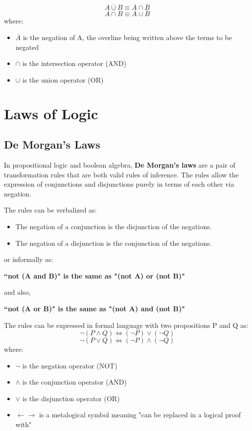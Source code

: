 \documentclass[12pt]{report}
\begin{document}
\[\overline{A \cup B}\equiv\overline{A} \cap \overline{B}\]
\[\overline{A \cap B}\equiv\overline{A} \cup \overline{B}\]
where:
\begin{itemize}
\item $\overline{A}$ is the negation of A, the overline being written above the terms to be negated
\item $\cap$ is the intersection operator (AND)
\item $\cup$ is the union operator (OR)
\end{itemize}

\newpage



\section*{Laws of Logic}

\subsection*{De Morgan's Laws}

In propositional logic and boolean algebra, \textbf{De Morgan's laws} are a pair of transformation rules that are both valid rules of inference. The rules allow the expression of conjunctions and disjunctions purely in terms of each other via negation.

\noindent The rules can be verbalized as:

\begin{itemize}
\item The negation of a conjunction is the disjunction of the negations.
\item The negation of a disjunction is the conjunction of the negations.
\end{itemize}
or informally as:
\begin{center}
\textbf{``not (A and B)" is the same as "(not A) or (not B)"
}
\end{center}

and also,
\begin{center}
\textbf{``not (A or B)" is the same as "(not A) and (not B)"
}
\end{center}
The rules can be expressed in formal language with two propositions P and Q as:
\[ \neg(P\land Q)\iff(\neg P)\lor(\neg Q)\]
\[\neg(P\lor Q)\iff(\neg P)\land(\neg Q)\]
where:
\begin{itemize}
\item $\neg$ is the negation operator (NOT)
\item $\wedge $ is the conjunction operator (AND)
\item $\vee$ is the disjunction operator (OR)
\item $\leftarrow \rightarrow$ is a metalogical symbol meaning "can be replaced in a logical proof with"
\end{itemize}
\end{document}
